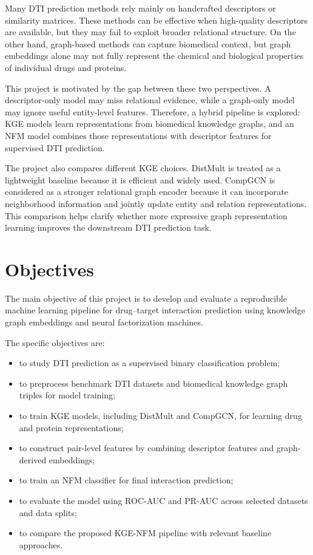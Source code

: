 Many DTI prediction methods rely mainly on handcrafted descriptors or similarity
matrices. These methods can be effective when high-quality descriptors are
available, but they may fail to exploit broader relational structure. On the
other hand, graph-based methods can capture biomedical context, but graph
embeddings alone may not fully represent the chemical and biological properties
of individual drugs and proteins.

This project is motivated by the gap between these two perspectives. A
descriptor-only model may miss relational evidence, while a graph-only model may
ignore useful entity-level features. Therefore, a hybrid pipeline is explored:
KGE models learn representations from biomedical knowledge graphs, and an NFM
model combines those representations with descriptor features for supervised DTI
prediction.

The project also compares different KGE choices. DistMult is treated as a
lightweight baseline because it is efficient and widely used. CompGCN is
considered as a stronger relational graph encoder because it can incorporate
neighborhood information and jointly update entity and relation representations.
This comparison helps clarify whether more expressive graph representation
learning improves the downstream DTI prediction task.

\section{Objectives}

The main objective of this project is to develop and evaluate a reproducible
machine learning pipeline for drug--target interaction prediction using
knowledge graph embeddings and neural factorization machines.

The specific objectives are:

\begin{itemize}
    \item to study DTI prediction as a supervised binary classification problem;

    \item to preprocess benchmark DTI datasets and biomedical knowledge graph
    triples for model training;

    \item to train KGE models, including DistMult and CompGCN, for learning
    drug and protein representations;

    \item to construct pair-level features by combining descriptor features and
    graph-derived embeddings;

    \item to train an NFM classifier for final interaction prediction;

    \item to evaluate the model using ROC-AUC and PR-AUC across selected
    datasets and data splits;

    \item to compare the proposed KGE-NFM pipeline with relevant baseline
    approaches.
\end{itemize}

